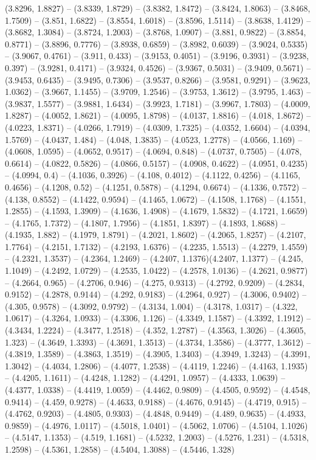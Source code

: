 (3.8296, 1.8827) -- (3.8339, 1.8729) -- (3.8382, 1.8472) -- (3.8424, 1.8063) -- (3.8468, 1.7509) -- (3.851, 1.6822) -- (3.8554, 1.6018) -- (3.8596, 1.5114) -- (3.8638, 1.4129) -- (3.8682, 1.3084) -- (3.8724, 1.2003) -- (3.8768, 1.0907) -- (3.881, 0.9822) -- (3.8854, 0.8771) -- (3.8896, 0.7776) -- (3.8938, 0.6859) -- (3.8982, 0.6039) -- (3.9024, 0.5335) -- (3.9067, 0.4761) -- (3.911, 0.433) -- (3.9153, 0.4051) -- (3.9196, 0.3931) -- (3.9238, 0.397) -- (3.9281, 0.4171) -- (3.9324, 0.4526) -- (3.9367, 0.5031) -- (3.9409, 0.5671) -- (3.9453, 0.6435) -- (3.9495, 0.7306) -- (3.9537, 0.8266) -- (3.9581, 0.9291) -- (3.9623, 1.0362) -- (3.9667, 1.1455) -- (3.9709, 1.2546) -- (3.9753, 1.3612) -- (3.9795, 1.463) -- (3.9837, 1.5577) -- (3.9881, 1.6434) -- (3.9923, 1.7181) -- (3.9967, 1.7803) -- (4.0009, 1.8287) -- (4.0052, 1.8621) -- (4.0095, 1.8798) -- (4.0137, 1.8816) -- (4.018, 1.8672) -- (4.0223, 1.8371) -- (4.0266, 1.7919) -- (4.0309, 1.7325) -- (4.0352, 1.6604) -- (4.0394, 1.5769) -- (4.0437, 1.484) -- (4.048, 1.3835) -- (4.0523, 1.2778) -- (4.0566, 1.169) -- (4.0608, 1.0595) -- (4.0652, 0.9517) -- (4.0694, 0.848) -- (4.0737, 0.7505) -- (4.078, 0.6614) -- (4.0822, 0.5826) -- (4.0866, 0.5157) -- (4.0908, 0.4622) -- (4.0951, 0.4235) -- (4.0994, 0.4) -- (4.1036, 0.3926) -- (4.108, 0.4012) -- (4.1122, 0.4256) -- (4.1165, 0.4656) -- (4.1208, 0.52) -- (4.1251, 0.5878) -- (4.1294, 0.6674) -- (4.1336, 0.7572) -- (4.138, 0.8552) -- (4.1422, 0.9594) -- (4.1465, 1.0672) -- (4.1508, 1.1768) -- (4.1551, 1.2855) -- (4.1593, 1.3909) -- (4.1636, 1.4908) -- (4.1679, 1.5832) -- (4.1721, 1.6659) -- (4.1765, 1.7372) -- (4.1807, 1.7956) -- (4.1851, 1.8397) -- (4.1893, 1.8688) -- (4.1935, 1.882) -- (4.1979, 1.8791) -- (4.2021, 1.8602) -- (4.2065, 1.8257) -- (4.2107, 1.7764) -- (4.2151, 1.7132) -- (4.2193, 1.6376) -- (4.2235, 1.5513) -- (4.2279, 1.4559) -- (4.2321, 1.3537) -- (4.2364, 1.2469) -- (4.2407, 1.1376)(4.2407, 1.1377) -- (4.245, 1.1049) -- (4.2492, 1.0729) -- (4.2535, 1.0422) -- (4.2578, 1.0136) -- (4.2621, 0.9877) -- (4.2664, 0.965) -- (4.2706, 0.946) -- (4.275, 0.9313) -- (4.2792, 0.9209) -- (4.2834, 0.9152) -- (4.2878, 0.9144) -- (4.292, 0.9183) -- (4.2964, 0.927) -- (4.3006, 0.9402) -- (4.305, 0.9578) -- (4.3092, 0.9792) -- (4.3134, 1.004) -- (4.3178, 1.0317) -- (4.322, 1.0617) -- (4.3264, 1.0933) -- (4.3306, 1.126) -- (4.3349, 1.1587) -- (4.3392, 1.1912) -- (4.3434, 1.2224) -- (4.3477, 1.2518) -- (4.352, 1.2787) -- (4.3563, 1.3026) -- (4.3605, 1.323) -- (4.3649, 1.3393) -- (4.3691, 1.3513) -- (4.3734, 1.3586) -- (4.3777, 1.3612) -- (4.3819, 1.3589) -- (4.3863, 1.3519) -- (4.3905, 1.3403) -- (4.3949, 1.3243) -- (4.3991, 1.3042) -- (4.4034, 1.2806) -- (4.4077, 1.2538) -- (4.4119, 1.2246) -- (4.4163, 1.1935) -- (4.4205, 1.1611) -- (4.4248, 1.1282) -- (4.4291, 1.0957) -- (4.4333, 1.0639) -- (4.4377, 1.0338) -- (4.4419, 1.0059) -- (4.4462, 0.9809) -- (4.4505, 0.9592) -- (4.4548, 0.9414) -- (4.459, 0.9278) -- (4.4633, 0.9188) -- (4.4676, 0.9145) -- (4.4719, 0.915) -- (4.4762, 0.9203) -- (4.4805, 0.9303) -- (4.4848, 0.9449) -- (4.489, 0.9635) -- (4.4933, 0.9859) -- (4.4976, 1.0117) -- (4.5018, 1.0401) -- (4.5062, 1.0706) -- (4.5104, 1.1026) -- (4.5147, 1.1353) -- (4.519, 1.1681) -- (4.5232, 1.2003) -- (4.5276, 1.231) -- (4.5318, 1.2598) -- (4.5361, 1.2858) -- (4.5404, 1.3088) -- (4.5446, 1.328) 